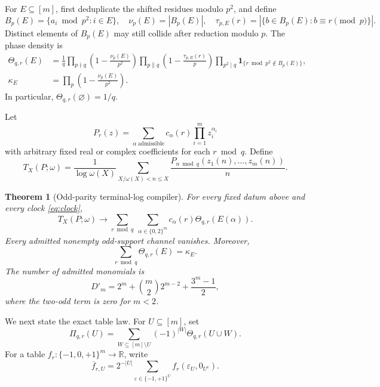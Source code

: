 \documentclass[11pt]{article}
\newtheorem{theorem}{Theorem}[section]
\theoremstyle{definition}
\theoremstyle{remark}
\newcommand{\ind}{\mathbf 1}
\newcommand{\T}{\{-1,0,+1\}}
\begin{document}
For \(E\subseteq[m]\), first deduplicate the shifted residues modulo
\(p^2\), and define
\begin{equation}
 B_p(E)=\{a_i\bmod p^2:i\in E\},\quad
 \nu_p(E)=|B_p(E)|,
 \quad
 \tau_{p,E}(r)=|\{b\in B_p(E):b\equiv r\pmod p\}|.
 \label{eq:local-data}
\end{equation}
Distinct elements of \(B_p(E)\) may still collide after reduction modulo
\(p\).  The phase density is
\begin{align}
 \Theta_{q,r}(E)
 &=\frac1q\prod_{p\nmid q}\left(1-\frac{\nu_p(E)}{p^2}\right)
 \prod_{p\parallel q}\left(1-\frac{\tau_{p,E}(r)}p\right)
 \prod_{p^2\mid q}\ind_{\{r\bmod p^2\notin B_p(E)\}},
 \label{eq:theta}\\
 \kappa_E&=\prod_p\left(1-\frac{\nu_p(E)}{p^2}\right).
 \label{eq:kappa}
\end{align}
In particular, \(\Theta_{q,r}(\varnothing)=1/q\).

Let
\begin{equation}
 P_r(z)=\sum_{\alpha\ \mathrm{admissible}}
 c_\alpha(r)\prod_{i=1}^m z_i^{\alpha_i}
 \label{eq:polynomial}
\end{equation}
with arbitrary fixed real or complex coefficients for each \(r\bmod q\).
Define
\begin{equation}
 T_X(P;\omega)=\frac1{\log\omega(X)}
 \sum_{X/\omega(X)<n\leq X}
 \frac{P_{n\bmod q}(z_1(n),\ldots,z_m(n))}{n}.
 \label{eq:functional}
\end{equation}

\begin{theorem}[Odd-parity terminal-log compiler]
\label{thm:compiler}
For every fixed datum above and every clock \eqref{eq:clock},
\begin{equation}
 T_X(P;\omega)\longrightarrow
 \sum_{r\bmod q}\ \sum_{\alpha\in\{0,2\}^m}
 c_\alpha(r)\Theta_{q,r}(E(\alpha)).
 \label{eq:compiler-limit}
\end{equation}
Every admitted nonempty odd-support channel vanishes.  Moreover,
\begin{equation}
 \sum_{r\bmod q}\Theta_{q,r}(E)=\kappa_E.
 \label{eq:phase-sum}
\end{equation}
The number of admitted monomials is
\begin{equation}
 D'_m=2^m+\binom m2 2^{m-2}+\frac{3^m-1}{2},
 \label{eq:dimension}
\end{equation}
where the two-odd term is zero for \(m<2\).
\end{theorem}

We next state the exact table law.  For \(U\subseteq[m]\), set
\begin{equation}
 \Pi_{q,r}(U)=\sum_{W\subseteq[m]\setminus U}
 (-1)^{|W|}\Theta_{q,r}(U\cup W).
 \label{eq:pi}
\end{equation}
For a table \(f_r:\T^m\to\mathbb R\), write
\begin{equation}
 \overline f_{r,U}=2^{-|U|}
 \sum_{\varepsilon\in\{-1,+1\}^U}
 f_r(\varepsilon_U,0_{U^c}).
 \label{eq:stratum-average}
\end{equation}
\end{document}
